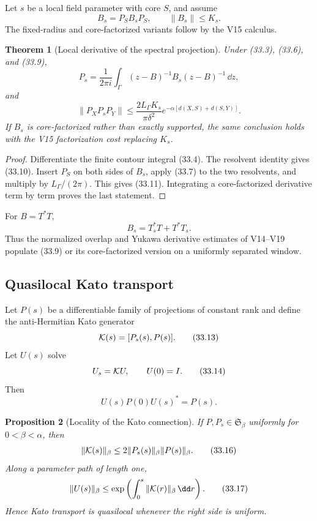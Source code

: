 \documentclass[11pt]{article}
\newtheorem{theorem}{Theorem}[section]
\newtheorem{proposition}[theorem]{Proposition}
\theoremstyle{remark}
\begin{document}
Let \(s\) be a local field parameter with core \(S\), and assume
\[
 B_s=P_SB_sP_S,\qquad\|B_s\|\le K_s.                       \tag{33.9}
\]
The fixed-radius and core-factorized variants follow by the V15
calculus.

\begin{theorem}[Local derivative of the spectral projection]
\label{thm:v15v33-derivative}
Under (33.3), (33.6), and (33.9),
\[
 P_s
 =
 \frac{1}{2\pi i}
 \int_\Gamma
 (z-B)^{-1}B_s(z-B)^{-1}\,\dd z,                           \tag{33.10}
\]
and
\[
 \boxed{
 \|P_XP_sP_Y\|
 \le
 \frac{2L_\Gamma K_s}{\pi\delta^2}
 e^{-\alpha[d(X,S)+d(S,Y)]}.}                              \tag{33.11}
\]
If \(B_s\) is core-factorized rather than exactly supported, the
same conclusion holds with the V15 factorization cost replacing
\(K_s\).
\end{theorem}

\begin{proof}
Differentiate the finite contour integral (33.4).  The resolvent
identity gives (33.10).  Insert \(P_S\) on both sides of \(B_s\),
apply (33.7) to the two resolvents, and multiply by
\(L_\Gamma/(2\pi)\).  This gives (33.11).  Integrating a
core-factorized derivative term by term proves the last statement.
\end{proof}

For \(B=T^*T\),
\[
 B_s=T_s^*T+T^*T_s.                                       \tag{33.12}
\]
Thus the normalized overlap and Yukawa derivative estimates of
V14--V19 populate (33.9) or its core-factorized version on a
uniformly separated window.

\subsection{Quasilocal Kato transport}

Let \(P(s)\) be a differentiable family of projections of constant
rank and define the anti-Hermitian Kato generator
\[
 {\cal K}(s)=[P_s(s),P(s)].                                \tag{33.13}
\]
Let \(U(s)\) solve
\[
 U_s={\cal K}U,\qquad U(0)=I.                              \tag{33.14}
\]
Then
\[
 U(s)P(0)U(s)^*=P(s).                                      \tag{33.15}
\]

\begin{proposition}[Locality of the Kato connection]
\label{prop:v15v33-kato-local}
If \(P,P_s\in{\mathfrak S}_\beta\) uniformly for
\(0<\beta<\alpha\), then
\[
 \|{\cal K}(s)\|_\beta
 \le2\|P_s(s)\|_\beta\|P(s)\|_\beta.                       \tag{33.16}
\]
Along a parameter path of length one,
\[
 \|U(s)\|_\beta
 \le
 \exp\left(\int_0^s\|{\cal K}(r)\|_\beta\,\dd r\right).     \tag{33.17}
\]
Hence Kato transport is quasilocal whenever the right side is
uniform.
\end{proposition}
\end{document}
